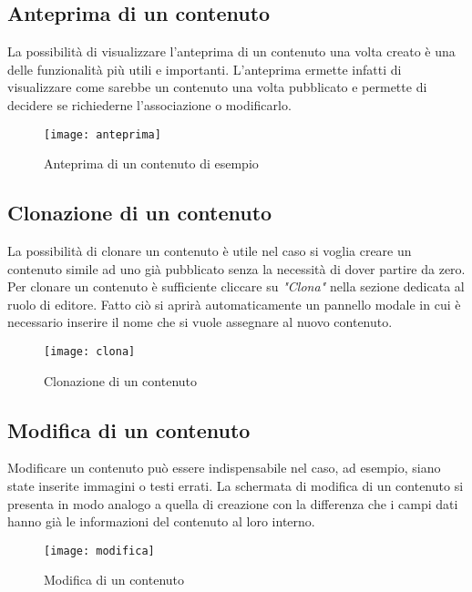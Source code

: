 \subsection{Anteprima di un contenuto}
La possibilità di visualizzare l'anteprima di un contenuto una volta creato è una delle funzionalità più utili e importanti. L'anteprima ermette infatti di visualizzare come sarebbe un contenuto una volta pubblicato e permette di decidere se richiederne l'associazione o modificarlo.
\begin{figure}[h]
    \begin{center}
    \texttt{[image: anteprima]}
    \caption{Anteprima di un contenuto di esempio}
    \label{fig:figure25}
    \end{center}
\end{figure}

\subsection{Clonazione di un contenuto}
La possibilità di clonare un contenuto è utile nel caso si voglia creare un contenuto simile ad uno già pubblicato senza la necessità di dover partire da zero. Per clonare un contenuto è sufficiente cliccare su \textit{"Clona"} nella sezione dedicata al ruolo di editore. Fatto ciò si aprirà automaticamente un pannello modale in cui è necessario inserire il nome che si vuole assegnare al nuovo contenuto.
\begin{figure}[h]
    \begin{center}
    \texttt{[image: clona]}
    \caption{Clonazione di un contenuto}
    \label{fig:figure26}
    \end{center}
\end{figure}

\subsection{Modifica di un contenuto}
Modificare un contenuto può essere indispensabile nel caso, ad esempio, siano state inserite immagini o testi errati. La schermata di modifica di un contenuto si presenta in modo analogo a quella di creazione con la differenza che i campi dati hanno già le informazioni del contenuto al loro interno.
\begin{figure}[h]
    \begin{center}
    \texttt{[image: modifica]}
    \caption{Modifica di un contenuto}
    \label{fig:figure27}
    \end{center}
\end{figure}
\newpage
